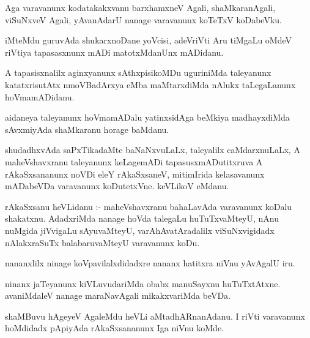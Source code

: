 \documentclass{article}
\begin{document}
\begin{mn}
Aga  varavanunx  kodatakakxvanu  barxhamxneV  Agali,  shaMkaranAgali,  viSuNxveV  Agali,  yAvanAdarU  nanage  varavanunx  koTeTxV koDabeVku.
\end{mn}

\begin{mn}
iMteMdu  guruvAda  shukarxnoDane  yoVcisi,  adeVriVti   Aru  tiMgaLu  oMdeV riVtiya  tapasasxnunx  mADi  matotxMdanUnx  mADidanu.
\end{mn}

\begin{mn}
A  tapasisxnalilx  aginxyanunx  sAthxpisikoMDu  uguriniMda  taleyanunx  katatxrisutAtx  nmoVBadArxya  eMba  maMtarxdiMda  
nAlukx  taLegaLanunx  hoVmamADidanu.
\end{mn}

\begin{mn}
aidaneya  taleyanunx  hoVmamADalu  yatinxsidAga  beMkiya  madhayxdiMda  sAvxmiyAda  shaMkaranu  horage  baMdanu.
\end{mn}

\begin{mn}
shudadhxvAda  saPxTikadaMte  baNaNxvuLaLx,  taleyalilx  caMdarxnuLaLx,  A  maheVshavxranu  taleyanunx  keLagemADi  
tapasusxmADutitxruva  A  rAkaSxsananunx noVDi  eleY  rAkaSxsaneV,  mitimIrida  kelasavanunx  mADabeVDa  varavanunx  
koDutetxVne.  keVLikoV  eMdanu.
\end{mn}

\begin{mn}
rAkaSxsanu  heVLidanu :- maheVshavxranu  bahaLavAda  varavanunx  koDalu  shakatxnu.  AdadxriMda  nanage  hoVda  
talegaLu  huTuTxvaMteyU,  nAnu  nuMgida  jiVvigaLu  sAyuvaMteyU,  varAhAvatAradalilx  viSuNxvigidadx  nAlakxraSuTx  
balabaruvaMteyU  varavanunx  koDu.                                                                                                                                          
\end{mn}

\begin{mn}
nananxlilx  ninage  koVpavilalxdidadxre  nananx  hatitxra  niVnu  yAvAgalU iru.
\end{mn}

\begin{mn}
ninanx  jaTeyanunx  kiVLuvudariMda  obabx  manuSayxnu  huTuTxtAtxne.  avaniMdaleV  nanage  maraNavAgali  mikakxvariMda  beVDa.
\end{mn}

\begin{mn}
shaMBuvu  hAgeyeV  AgaleMdu  heVLi  aMtadhARnanAdanu.  I  riVti  varavanunx  hoMdidadx  pApiyAda  rAkaSxsananunx  Iga  niVnu  koMde.
\end{mn}
\end{document}
